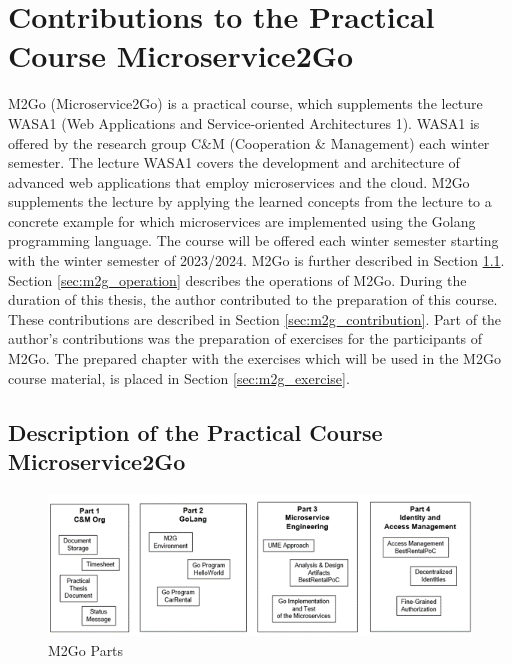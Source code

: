 \chapter{Contributions to the Practical Course Microservice2Go}
\label{cha:m2go}


M2Go (Microservice2Go) is a practical course, which supplements the lecture
WASA1 (Web Applications and Service-oriented Architectures 1). WASA1 is offered
by the research group C\&M (Cooperation \& Management) each winter semester.
The lecture WASA1 covers the development and architecture of advanced web
applications that employ microservices and the cloud. M2Go supplements the
lecture by applying the learned concepts from the lecture to a concrete example
for which microservices are implemented using the Golang programming language.
The course will be offered each winter semester starting with the winter
semester of 2023/2024. M2Go is further described in Section
\ref{sec:m2g_description}. Section \ref{sec:m2g_operation} describes the
operations of M2Go. During the duration of this thesis, the author contributed
to the preparation of this course. These contributions are described in Section
\ref{sec:m2g_contribution}. Part of the author's contributions was the
preparation of exercises for the participants of M2Go. The prepared chapter
with the exercises which will be used in the M2Go course material, is placed in
Section \ref{sec:m2g_exercise}.

\section{Description of the Practical Course Microservice2Go}
\label{sec:m2g_description}

\begin{figure}[h]
	\centering
	\includegraphics[width=\textwidth]{figures/m2go_parts.png}
	\caption{M2Go Parts \cite{CM-W-M2G}}
	\label{fig:m2go_parts}
\end{figure}

